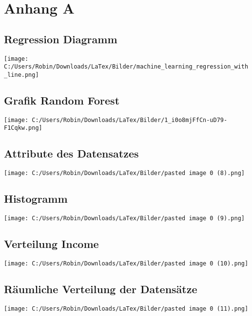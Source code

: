 \chapter{Anhang A}
\label{chap:anhang_a}

\section{Regression Diagramm}
\label{anhang1}
\texttt{[image: C:/Users/Robin/Downloads/LaTex/Bilder/machine\_learning\_regression\_with\_line.png]}

\section{Grafik Random Forest}
\label{anhang2}
\texttt{[image: C:/Users/Robin/Downloads/LaTex/Bilder/1\_i0o8mjFfCn-uD79-F1Cqkw.png]}

\section{Attribute des Datensatzes}
\label{anhang3}
\texttt{[image: C:/Users/Robin/Downloads/LaTex/Bilder/pasted image 0 (8).png]}

\section{Histogramm}
\label{anhang4}
\texttt{[image: C:/Users/Robin/Downloads/LaTex/Bilder/pasted image 0 (9).png]}

\section{Verteilung Income}
\label{anhang5}
\texttt{[image: C:/Users/Robin/Downloads/LaTex/Bilder/pasted image 0 (10).png]}


\section{Räumliche Verteilung der Datensätze}
\label{anhang6}
\texttt{[image: C:/Users/Robin/Downloads/LaTex/Bilder/pasted image 0 (11).png]}
